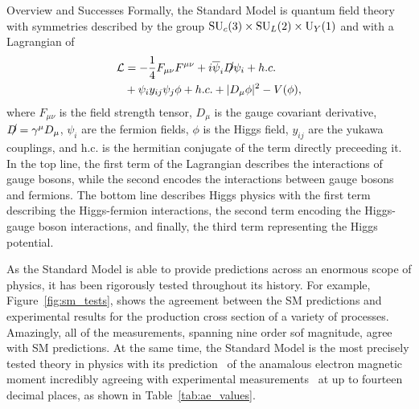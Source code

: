 \begin{section}{Overview and Successes}
Formally, the Standard Model is quantum field theory with symmetries described by the group $\mathrm{SU}_c(3) \times \mathrm{SU}_L(2) \times \mathrm{U}_Y(1)$ and with a Lagrangian of
\begin{align}
\mathcal{L} &= -\frac{1}{4}F_{\mu\nu}F^{\mu\nu} \nonumber + i\overline{\psi}_i\slashed{D}\psi_i + h.c. \\
            &+ \psi_{i}y_{ij}\psi_{j}\phi + h.c. \nonumber + |D_{\mu}\phi|^2 - V(\phi),
\end{align}
where $F_{\mu\nu}$ is the field strength tensor, $D_{\mu}$ is the gauge covariant derivative, $\slashed{D} = \gamma^{\mu}D_{\mu}$, $\psi_{i}$ are the fermion fields, $\phi$ is the Higgs field, $y_{ij}$ are the yukawa couplings, and h.c. is the hermitian conjugate of the term directly preceeding it.
In the top line, the first term of the Lagrangian describes the interactions of gauge bosons, while the second encodes the interactions between gauge bosons and fermions.
The bottom line describes Higgs physics with the first term describing the Higgs-fermion interactions, the second term encoding the Higgs-gauge boson interactions, and finally, the third term representing the Higgs potential.

As the Standard Model is able to provide predictions across an enormous scope of physics, it has been rigorously tested throughout its history.
For example, Figure~\ref{fig:sm_tests}, shows the agreement between the SM predictions and experimental results for the production cross section of a variety of processes.
Amazingly, all of the measurements, spanning nine order sof magnitude, agree with SM predictions.
At the same time, the Standard Model is the most precisely tested theory in physics with its prediction~\cite{PhysRevLett.109.111807} of the anamalous electron magnetic moment incredibly agreeing with experimental measurements~\cite{PhysRevLett.100.120801,PhysRevA.83.052122} at up to fourteen decimal places, as shown in Table~\ref{tab:ae_values}.


\end{section}
